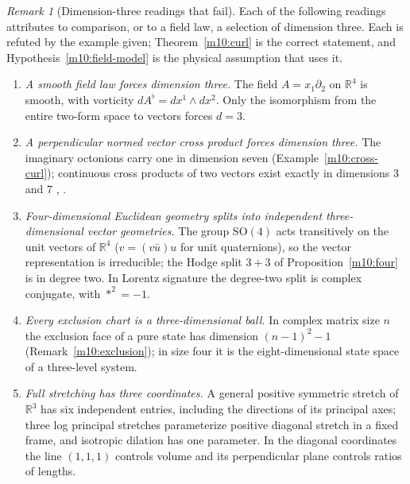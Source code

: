 \documentclass[11pt,reqno]{amsart}
\theoremstyle{definition}
\theoremstyle{remark}
\newtheorem{remark}[theorem]{Remark}
\numberwithin{equation}{section}
\newcommand{\R}{\mathbb{R}}
\newcommand{\SO}{\mathrm{SO}}
\begin{document}
\begin{remark}[Dimension-three readings that fail]\label{m10:folklore}
Each of the following readings attributes to comparison, or to a
field law, a selection of dimension three. Each is refuted by the
example given; Theorem~\ref{m10:curl} is the correct statement, and
Hypothesis~\ref{m10:field-model} is the physical assumption that uses it.
\begin{enumerate}[label=(\roman*)]
\item \emph{A smooth field law forces dimension three.} The field
\(A=x_1\partial_2\) on \(\R^4\) is smooth, with vorticity
\(dA^\flat=dx^1\wedge dx^2\). Only the isomorphism from the entire
two-form space to vectors forces \(d=3\).
\item \emph{A perpendicular normed vector cross product forces
dimension three.} The imaginary octonions carry one in dimension seven
(Example~\ref{m10:cross-curl}); continuous cross products of two vectors
exist exactly in dimensions \(3\) and \(7\) \cite{m10:Eckmann},
\cite[\S2]{m10:BrownGray}.
\item \emph{Four-dimensional Euclidean geometry splits into independent
three-dimensional vector geometries.} The group \(\SO(4)\) acts
transitively on the unit vectors of \(\R^4\) (\(v=(v\bar u)u\) for unit
quaternions), so the vector representation is irreducible; the Hodge
split \(3+3\) of Proposition~\ref{m10:four} is in degree two. In
Lorentz signature the degree-two split is complex conjugate, with
\(*^2=-1\).
\item \emph{Every exclusion chart is a three-dimensional ball.} In
complex matrix size \(n\) the exclusion face of a pure state has
dimension \((n-1)^2-1\) (Remark~\ref{m10:exclusion}); in size four it is
the eight-dimensional state space of a three-level system.
\item \emph{Full stretching has three coordinates.} A general positive
symmetric stretch of \(\R^3\) has six independent entries, including
the directions of its principal axes; three log principal stretches
parameterize positive diagonal stretch in a fixed frame, and isotropic
dilation has one parameter. In the diagonal coordinates the line
\((1,1,1)\) controls volume and its perpendicular plane controls ratios
of lengths.
\end{enumerate}
\end{remark}
\end{document}
